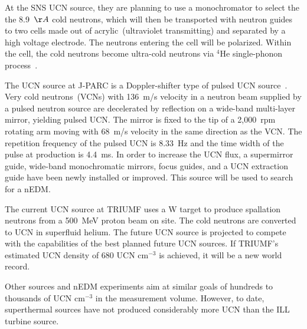 At the SNS UCN source, they are planning to use a monochromator to
select the the 8.9~$\AA$ cold neutrons, which will then be transported
with neutron guides to two cells made out of acrylic~(ultraviolet
transmitting) and separated by a high voltage electrode. The neutrons
entering the cell will be polarized. Within the cell, the cold
neutrons become ultra-cold neutrons via $^4$He single-phonon
process~\cite{kolarkar2010}.



The UCN source at J-PARC is a Doppler-shifter type of pulsed UCN
source~\cite{Imajo2015}. Very cold neutrons~(VCNs) with 136~m/s
velocity in a neutron beam supplied by a pulsed neutron source are
decelerated by reflection on a wide-band multi-layer mirror, yielding
pulsed UCN. The mirror is fixed to the tip of a 2,000~rpm rotating arm
moving with 68~m/s velocity in the same direction as the VCN. The
repetition frequency of the pulsed UCN is 8.33~Hz and the time width
of the pulse at production is 4.4~ms. In order to increase the UCN
flux, a supermirror guide, wide-band monochromatic mirrors, focus
guides, and a UCN extraction guide have been newly installed or
improved. This source will be used to search for a nEDM.


The current UCN source at TRIUMF uses a W target to produce spallation
neutrons from a 500~MeV proton beam on site. The cold neutrons are
converted to UCN in superfluid helium.  The future UCN source is
projected to compete with the capabilities of the best planned future
UCN sources. If TRIUMF's estimated UCN density of 680 UCN cm$^{-3}$ is
achieved, it will be a new world record.

Other sources and nEDM experiments aim at similar goals of hundreds to
thousands of UCN cm$^{-3}$ in the measurement volume. However, to
date, superthermal sources have not produced considerably more UCN
than the ILL turbine source.


 


